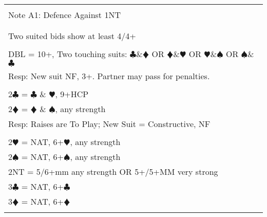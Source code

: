 \documentclass{article}
\newcommand\C{\ensuremath{\clubsuit}}
\newcommand\D{\color{red}\ensuremath{\vardiamondsuit}}
\renewcommand\H{\color{red}\ensuremath{\varheartsuit}}
\renewcommand\S{\ensuremath{\spadesuit}}
\newcommand\N{{\footnotesize NT}}
\begin{document}
\begin{tabular}{|l|}
\hline \\[-1em]
\cellcolor{green!25} \Large Note A1: Defence Against 1NT \\[-1em] 
\\ \hline
\\
\Large Two suited bids show at least 4/4+  \\
\\
\Large DBL = 10+, Two touching suits: {\C}\&{\D} OR {\D}\&{\H} OR {\H}\&{\S} OR {\S}\&{\C} \\ 
\large Resp: New suit NF, 3+. Partner may pass for penalties. \\
\\
\Large 2{\C} = {\C} \& {\H}, 9+HCP \\
\Large 2{\D} = {\D} \& {\S}, any strength  \\
\large Resp: Raises are To Play; New Suit = Constructive, NF \\
\\
\Large 2{\H} = NAT, 6+{\H}, any strength \\
\Large 2{\S} = NAT, 6+{\S}, any strength \\
\Large 2{\N} = 5/6+mm any strength OR 5+/5+MM very strong\\ 
\Large 3{\C} = NAT, 6+{\C} \\
\Large 3{\D} = NAT, 6+{\D} \\
\\ \hline
\end{tabular}
\end{document}
